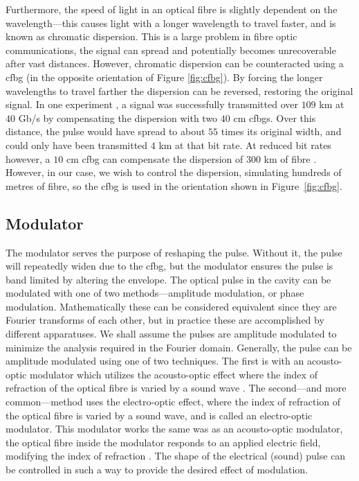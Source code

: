 Furthermore, the speed of light in an optical fibre is slightly dependent on the wavelength---this causes light with a longer wavelength to travel faster, and is known as chromatic dispersion. This is a large problem in fibre optic communications, the signal can spread and potentially becomes unrecoverable after vast distances. However, chromatic dispersion can be counteracted using a \gls{cfbg} \cite{agrawal2002, alazzawi, becker, starodoumov} (in the opposite orientation of Figure \ref{fig:cfbg}). By forcing the longer wavelengths to travel farther the dispersion can be reversed, restoring the original signal. In one experiment \cite{dong}, a signal was successfully transmitted over $109$ km at $40$ Gb/s by compensating the dispersion with two  $40$ cm \gls{cfbg}s. Over this distance, the pulse would have spread to about $55$ times its original width, and could only have been transmitted $4$ km at that bit rate. At reduced bit rates however, a $10$ cm \gls{cfbg} can compensate the dispersion of $300$ km of fibre \cite{agrawal2002}. However, in our case, we wish to control the dispersion, simulating hundreds of metres of fibre, so the \gls{cfbg} is used in the orientation shown in Figure~\ref{fig:cfbg}. \\

\subsection{Modulator}
The modulator serves the purpose of reshaping the pulse. Without it, the pulse will repeatedly widen due to the \gls{cfbg}, but the modulator ensures the pulse is band limited by altering the envelope. The optical pulse in the cavity can be modulated with one of two methods---amplitude modulation, or phase modulation. Mathematically these can be considered equivalent since they are Fourier transforms of each other, but in practice these are accomplished by different apparatuses. We shall assume the pulses are amplitude modulated to minimize the analysis required in the Fourier domain. Generally, the pulse can be amplitude modulated using one of two techniques. The first is with an acousto-optic modulator which utilizes the acousto-optic effect where the index of refraction of the optical fibre is varied by a sound wave \cite{hausbook, karim}. The second---and more common---method uses the electro-optic effect, where the index of refraction of the optical fibre is varied by a sound wave, and is called an electro-optic modulator. This modulator works the same was as an acousto-optic modulator, the optical fibre inside the modulator responds to an applied electric field, modifying the index of refraction \cite{agrawal2002, goldstein, hausbook, karim}. The shape of the electrical (sound) pulse can be controlled in such a way to provide the desired effect of modulation. \\

